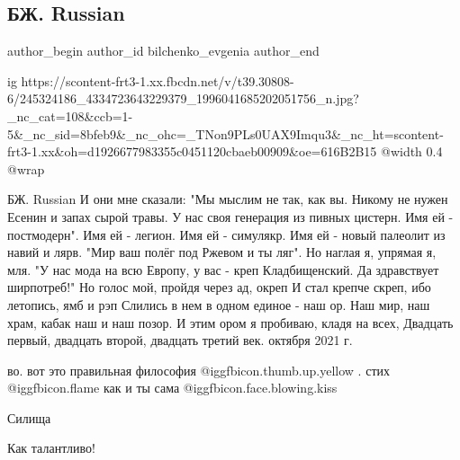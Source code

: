  
 
 
 
 
 
\subsection{БЖ. Russian}
\label{sec:12_10_2021.fb.bilchenko_evgenia.1.russian}
 
\ifcmt
 author_begin
   author_id bilchenko_evgenia
 author_end
\fi

\ifcmt
  ig https://scontent-frt3-1.xx.fbcdn.net/v/t39.30808-6/245324186_4334723643229379_1996041685202051756_n.jpg?_nc_cat=108&ccb=1-5&_nc_sid=8bfeb9&_nc_ohc=_TNon9PLs0UAX9Imqu3&_nc_ht=scontent-frt3-1.xx&oh=d1926677983355c0451120cbaeb00909&oe=616B2B15
  @width 0.4
  @wrap 
\fi

\obeycr
БЖ. Russian
\smallskip
И они мне сказали: "Мы мыслим не так, как вы.
Никому не нужен Есенин и запах сырой травы.
У нас своя генерация из пивных цистерн.
Имя ей - постмодерн".
Имя ей - легион. Имя ей - симулякр.
Имя ей - новый палеолит из навий и лярв.
"Мир ваш полёг под Ржевом и ты ляг".
\smallskip
Но наглая я, упрямая я, мля.
"У нас мода на всю Европу, у вас - креп
Кладбищенский. Да здравствует ширпотреб!"
Но голос мой, пройдя через ад, окреп
И стал крепче скреп, ибо летопись, ямб и рэп
Слились в нем в одном единое - наш ор.
\smallskip
Наш мир, наш храм, кабак наш и наш позор.
И этим ором я пробиваю, кладя на всех,
\smallskip
Двадцать первый, 
двадцать второй, 
двадцать третий 
век.
 октября 2021 г.
\restorecr

\begin{itemize} %
во. вот это правильная философия  @igg{fbicon.thumb.up.yellow} . стих  @igg{fbicon.flame}  как и ты сама @igg{fbicon.face.blowing.kiss} 

Силища

Как талантливо!
\end{itemize} %
